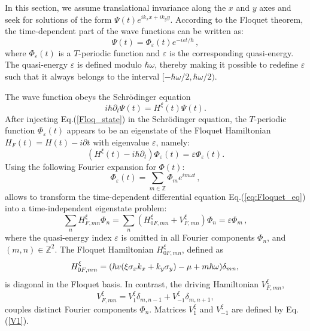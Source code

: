 \documentclass[aps,prb,showpacs,superscriptaddress,twocolumn,10pt,floatfix]{revtex4-1}
\newcommand{\ep}{\varepsilon}
\begin{document}
In this section, we assume translational invariance along the $x$ and $y$ axes and seek for solutions of the form $\Psi(t) e^{i k_x x+i k_y y}$. According to the Floquet theorem, the time-dependent part of the wave functions can be written as: 
\begin{equation}
\Psi(t) = \Phi_\ep(t) e^{- i \ep t/\hbar}  \,  ,
\label{Floq_state} 
\end{equation}
where $\Phi_\ep(t)$ is a $T$-periodic function and $\ep$ is the corresponding quasi-energy. The quasi-energy $\ep$ is defined modulo $\hbar \omega$, thereby making it possible to redefine $\ep$ such that it always belongs to the interval $[-\hbar\omega/2,\hbar\omega/2)$.

The wave function obeys the Schr\"{o}dinger equation
\begin{equation}
  i\hbar\partial_t   \Psi(t)  = H^\xi (t)   \Psi(t).
 \label{eq:Schro_eq}
\end{equation}
After injecting Eq.(\ref{Floq_state}) in the Schr\"{o}dinger equation, the $T$-periodic function $\Phi_\ep(t)$ appears to be an eigenstate of the Floquet Hamiltonian $H_F(t)=H(t)-i\partial t$ with eigenvalue $\ep$, namely:
\begin{equation}
 \left(H^\xi (t) - i\hbar\partial_t   \right)  \Phi_\ep(t)  = \ep   \Phi_\ep(t).
 \label{eq:Floquet_eq}
\end{equation}
Using the following Fourier expansion for $\Phi(t)$:
\begin{equation}
 \Phi_\ep(t) = \sum_{m \in \mathbb{Z}} \Phi_m e^{i m \omega t}  \, ,  
\label{Floq_fourier} 
\end{equation}
allows to transform the time-dependent differential equation Eq.(\ref{eq:Floquet_eq}) into a time-independent eigenstate problem\cite{Sambe1973,Shirley1965}:
\begin{equation}
 \sum_n H_{F,mn}^\xi \Phi_n = \sum_n (H^\xi_{0F,mn} +V_{F,mn}^\xi)  \Phi_n =\ep  \Phi_m \, ,
 \label{eq:FloquetFourier}
\end{equation}
where the quasi-energy index $\ep$ is omitted in all Fourier components $\Phi_n$, and $(m,n) \in  \mathbb{Z}^2$. The Floquet Hamiltonian $H^\xi_{0F,mn}$, defined as
\begin{equation}
\label{Floq_mat1}
H_{0F,mn}^\xi=(\hbar v(\xi\sigma_x k_x  + k_y \sigma_y) - \mu  +  m \hbar\omega )  \delta_{mn}, \\
\end{equation}
is diagonal in the Floquet basis. In contrast, the driving Hamiltonian $V_{F,mn}^\xi$,   
\begin{equation}
\label{Floq_mat2}
V_{F,mn}^\xi =V_{1}^\xi \delta_{m,n-1} + V_{-1}^\xi \delta_{m,n+1},
\end{equation}
couples distinct Fourier components $\Phi_n$. Matrices $V_{1}^\xi$ and $V_{-1}^\xi$ are defined by Eq.(\ref{V1}).
\end{document}
